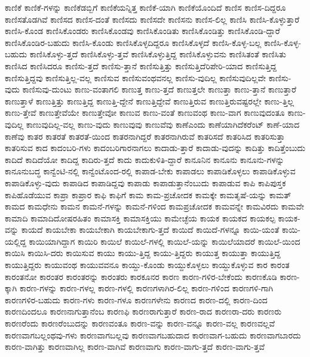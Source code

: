 {ಕಾಣಿಕೆ
ಕಾಣಿಕೆ-ಗಳನ್ನು
ಕಾಣಿಕೆಡಬ್ಬಿಗೆ
ಕಾಣಿಕೆಯನ್ನಿತ್ತ
ಕಾಣಿಕೆ-ಯಾಗಿ
ಕಾಣಿಕೆಯೊಂದಿದೆ
ಕಾಣಿಸ
ಕಾಣಿಸ-ದಿದ್ದರೂ
ಕಾಣಿಸತೊಡಗಿವೆ
ಕಾಣಿಸದ
ಕಾಣಿಸ-ದಂತೆ
ಕಾಣಿಸದು
ಕಾಣಿಸದೇ
ಕಾಣಿಸನು
ಕಾಣಿಸ-ಲಿಲ್ಲ
ಕಾಣಿಸಿ
ಕಾಣಿಸಿ-ಕೊಳ್ಳುತ್ತಾರೆ
ಕಾಣಿಸಿ-ಕೊಂಡ
ಕಾಣಿಸಿಕೊಂಡರು
ಕಾಣಿಸಿಕೊಂಡವು
ಕಾಣಿಸಿಕೊಂಡಿತು
ಕಾಣಿಸಿಕೊಂಡಿತ್ತು
ಕಾಣಿಸಿಕೊಂಡಿ-ದ್ದಾರೆ
ಕಾಣಿಸಿಕೊಂಡಿರ-ಬಹುದು
ಕಾಣಿಸಿ-ಕೊಂಡು
ಕಾಣಿಸಿಕೊಳ್ಳದಿದ್ದರೂ
ಕಾಣಿಸಿಕೊಳ್ಳದೆ
ಕಾಣಿಸಿ-ಕೊಳ್ಳ-ಬಲ್ಲ
ಕಾಣಿಸಿ-ಕೊಳ್ಳ-ಬಹುದು
ಕಾಣಿಸಿಕೊಳ್ಳು-ತ್ತದೆ
ಕಾಣಿಸಿಕೊಳ್ಳು-ತ್ತವೆ
ಕಾಣಿಸಿಕೊಳ್ಳುತ್ತಿದ್ದ
ಕಾಣಿಸಿಕೊಳ್ಳುವನು
ಕಾಣಿಸಿತಂತೆ
ಕಾಣಿಸಿತು
ಕಾಣಿಸಿದ
ಕಾಣಿಸಿದರೂ
ಕಾಣಿಸು-ತ್ತದೆ
ಕಾಣಿಸು-ತ್ತಾನೆ
ಕಾಣಿಸುತ್ತಿತ್ತು
ಕಾಣಿಸುತ್ತಿದೆರಿಪೇರಿ-ಯಾದ
ಕಾಣಿಸುತ್ತಿದ್ದ
ಕಾಣಿಸುತ್ತಿದ್ದವು
ಕಾಣಿಸುತ್ತಿಲ್ಲ-ವಲ್ಲ
ಕಾಣಿಸುವ
ಕಾಣಿಸುವಂಥವನಲ್ಲ
ಕಾಣಿಸು-ವುದಿಲ್ಲ
ಕಾಣಿಸುವುದಿಲ್ಲವೇ
ಕಾಣಿಸು-ವುದು
ಕಾಣಿಸುವು-ದುಂಟು
ಕಾಣು-ವಂತಾಗಲಿ
ಕಾಣುತ್ತ
ಕಾಣು-ತ್ತದೆ
ಕಾಣುತ್ತಲೇ
ಕಾಣುತ್ತಾ
ಕಾಣು-ತ್ತಾನೆ
ಕಾಣುತ್ತಾರೆ
ಕಾಣುತ್ತಾಳೆ
ಕಾಣುತ್ತಿತ್ತು
ಕಾಣುತ್ತಿದ್ದ
ಕಾಣುತ್ತಿ-ದ್ದೇನೆ
ಕಾಣುತ್ತಿದ್ದೇವೆ
ಕಾಣುತ್ತಿರುವ
ಕಾಣುತ್ತಿರುವಷ್ಟರಲ್ಲೇ
ಕಾಣು-ತ್ತಿಲ್ಲ
ಕಾಣು-ತ್ತೇವೆ
ಕಾಣುತ್ತೇವೆಯೇ
ಕಾಣುತ್ತೇವೋ
ಕಾಣುವ
ಕಾಣು-ವಂತೆ
ಕಾಣುವಂಥ
ಕಾಣು-ವಾಗ
ಕಾಣುವುದಂತೂ
ಕಾಣು-ವುದಿಲ್ಲ
ಕಾಣುವುದಿಲ್ಲ-ವಲ್ಲ
ಕಾಣು-ವುದು
ಕಾಣುವುವು
ಕಾಣುವೆವು
ಕಾಣೆಎಂದು
ಕಾಣೆಯಾಗಿದೆಕರೆಂಟ್
ಕಾಣೆ-ಯಾದ
ಕಾಣೆವು
ಕಾತರ
ಕಾತರತೆ
ಕಾತರತೆ-ಯಿಂದ
ಕಾತರನಾಗಿದ್ದರೆ
ಕಾತರನಾಗಿರುವೆ
ಕಾತರಿಸದೆ
ಕಾತರಿಸಿದ
ಕಾತರಿಸುತ್ತಾ
ಕಾತರಿಸುವ
ಕಾದ
ಕಾದಂಬರಿ-ಗಳು
ಕಾದಂಬರಿಗಾರನಾಗಲು
ಕಾದಾಡು-ತ್ತಾರೆ
ಕಾದಾಡು-ವುದನ್ನು
ಕಾದಿತ್ತು
ಕಾದಿತ್ತೆಂಬುದು
ಕಾದಿದೆ
ಕಾದಿದೆಯೋ
ಕಾದಿದ್ದ
ಕಾದಿರು-ತ್ತದೆ
ಕಾದು
ಕಾದುಕುಳಿತಿ-ದ್ದಾರೆ
ಕಾನೂನಿನ
ಕಾನೂನು
ಕಾನೂನು-ಗಳನ್ನು
ಕಾನೂನುಬದ್ಧ
ಕಾನ್ವೆಂಟಿ-ನಲ್ಲಿ
ಕಾನ್ವೆಂಟೊಂದ-ರಲ್ಲಿ
ಕಾಪಾಡ-ಬೇಕು
ಕಾಪಾಡಲು
ಕಾಪಾಡಿಕೊಳ್ಳಲು
ಕಾಪಾಡಿಕೊಳ್ಳುವ
ಕಾಪಾಡಿಕೊಳ್ಳು-ವುದು
ಕಾಪಾಡಿದ
ಕಾಪಾಡಿದ್ದವು
ಕಾಪಾಡು
ಕಾಪಾಡುತ್ತಾನೆಂಬುದು
ಕಾಪಾಡುವ
ಕಾಪಿ
ಕಾಪಿಪುಸ್ತಕ
ಕಾಪಿಹೊಡೆಯುವ
ಕಾಪ್ರಾ
ಕಾಪ್ರಾರ
ಕಾಫಿ
ಕಾಫಿಗೆ
ಕಾಮ
ಕಾಮ-ಪ್ರಚೋದಕ
ಕಾಮಕ್ಕೇ
ಕಾಮತೃಷೆ-ಯನ್ನು
ಕಾಮತ್
ಕಾಮದ
ಕಾಮಧೇನು
ಕಾಮನ
ಕಾಮನೆ-ಗಳನ್ನು
ಕಾಮನೆ-ಗಳಿಂದ
ಕಾಮಪ್ರಚೋದಕ
ಕಾಮವನ್ನೇ
ಕಾಮವಿರದು
ಕಾಮವೇ
ಕಾಮಾದಿ
ಕಾಮಾದಿದೋಷರಹಿತಂ
ಕಾಮಾಸಕ್ತಿ
ಕಾಮಾಸಕ್ತಿಯು
ಕಾಮೇಚ್ಛೆಯ
ಕಾಯಕ
ಕಾಯಕದ
ಕಾಯಕಲ್ಪ
ಕಾಯಕ-ವನ್ನು
ಕಾಯದೆ
ಕಾಯಬೇಕಾ
ಕಾಯಬೇಕಾಗಿ
ಕಾಯಬೇಕಾಗು-ತ್ತದೆ
ಕಾಯಿದೆ
ಕಾಯಿದೆ-ಗಳನ್ನೂ
ಕಾಯಿ-ಯಂತೆ
ಕಾಯಿ-ಯಲ್ಲಿದ್ದ
ಕಾಯಿಯಾಗಿದ್ದಾಗ
ಕಾಯಿರಿ
ಕಾಯಿಲೆ
ಕಾಯಿಲೆ-ಗಳಲ್ಲಿ
ಕಾಯಿಲೆ-ಯನ್ನು
ಕಾಯಿಲೆಯಾದರೆ
ಕಾಯಿಲೆ-ಯಿಂದ
ಕಾಯಿಸಿ
ಕಾಯಿಸಿ-ದರು
ಕಾಯಿಸುವ
ಕಾಯು
ಕಾಯು-ತ್ತಿದ್ದ
ಕಾಯು-ತ್ತಿದ್ದರು
ಕಾಯುತ್ತ
ಕಾಯುತ್ತಾ
ಕಾಯುತ್ತಿದ್ದ
ಕಾಯುತ್ತಿದ್ದರು
ಕಾಯುವಂಥ
ಕಾಯುವವನೂ
ಕಾಯ್ದು-ಕೊಂಡು
ಕಾಯ್ದುಕೊಳ್ಳಲು
ಕಾಯ್ದುಕೊಳ್ಳುವ
ಕಾರ
ಕಾರಂತ
ಕಾರಂತನೋ
ಕಾರಂತರ
ಕಾರಂತರನ್ನು
ಕಾರಂತರು
ಕಾರಕೂನರ
ಕಾರಣ
ಕಾರಣ-ಗಳಿರ-ಬೇಕೆಂದು
ಕಾರಣಕೊಡಿ
ಕಾರಣ-ಕ್ಕಾಗಿ
ಕಾರಣ-ಗಳನ್ನು
ಕಾರಣ-ಗಳಲ್ಲ
ಕಾರಣ-ಗಳಲ್ಲಿ
ಕಾರಣಗಳಾಗಿರ-ಲಿಲ್ಲ
ಕಾರಣ-ಗಳಿಂದ
ಕಾರಣಗಳಿ-ಗಾಗಿ
ಕಾರಣಗಳಿರ-ಬಹುದು
ಕಾರಣ-ಗಳು
ಕಾರಣ-ಗಳೂ
ಕಾರಣಗಳೇನು
ಕಾರಣದ
ಕಾರಣ-ದಲ್ಲಿ
ಕಾರಣ-ದಿಂದ
ಕಾರಣದಿಂದಲೂ
ಕಾರಣನಾಗುತ್ತಾನೆಂಬ
ಕಾರಣಫಿ
ಕಾರಣರಾಗುತ್ತಾರೆ
ಕಾರಣ-ರಾದ
ಕಾರಣರಾ-ದರು
ಕಾರಣರು
ಕಾರಣರೆಂದು
ಕಾರಣರೆಂಬುದನ್ನು
ಕಾರಣವಂತೂ
ಕಾರಣ-ವನ್ನು
ಕಾರಣ-ವನ್ನೂ
ಕಾರಣ-ವಲ್ಲ
ಕಾರಣವಲ್ಲವೆ
ಕಾರಣವಾಗಬಲ್ಲಂಥವು-ಗಳು
ಕಾರಣವಾಗಬಲ್ಲವು
ಕಾರಣವಾಗಬಹುದಾದ
ಕಾರಣವಾಗ-ಬಹುದು
ಕಾರಣವಾಗಬಾರದು
ಕಾರಣ-ವಾಗಿತ್ತು
ಕಾರಣವಾಗಿಲ್ಲ
ಕಾರಣ-ವಾಗಿವೆ
ಕಾರಣವಾಗು
ಕಾರಣ-ವಾಗು-ತ್ತದೆ
ಕಾರಣ-ವಾಗು-ತ್ತವೆ
}
